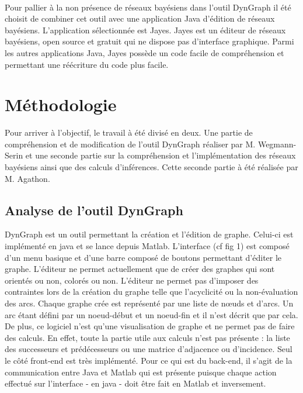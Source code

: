 \documentclass[conference]{IEEEtran}
\begin{document}
\\
Pour pallier à la non présence de réseaux bayésiens dans l'outil DynGraph il été choisit de combiner cet outil avec une application Java d'édition de réseaux bayésiens. L'application sélectionnée est Jayes. Jayes est un éditeur de réseaux bayésiens, open source et gratuit qui ne dispose pas d'interface graphique. Parmi les autres applications Java, Jayes possède un code facile de compréhension et permettant une réécriture du code plus facile.




\section{Méthodologie}

Pour arriver à l'objectif, le travail à été divisé en deux. Une partie de compréhension et de modification de l'outil DynGraph réaliser par M. Wegmann-Serin et une seconde partie sur la compréhension et l'implémentation des réseaux bayésiens ainsi que des calculs d'inférences. Cette seconde partie à été réalisée par M. Agathon. \\


\subsection{Analyse de l'outil DynGraph}

DynGraph est un outil permettant la création et l'édition de graphe. Celui-ci est implémenté en java et se lance depuis Matlab.
L'interface (cf fig 1) est composé d'un menu basique et d'une barre composé de boutons permettant d'éditer le graphe. L'éditeur ne permet actuellement que de créer des graphes qui sont orientés ou non, colorés ou non. L'éditeur ne permet pas d'imposer des contraintes lors de la création du graphe telle que l'acyclicité ou la non-évaluation des arcs. Chaque graphe crée est représenté par une liste de nœuds et d'arcs. Un arc étant défini par un noeud-début et un noeud-fin et il n'est décrit que par cela. De plus, ce logiciel n'est qu'une visualisation de graphe et ne permet pas de faire des calculs. En effet, toute la partie utile aux calculs n'est pas présente : la liste des successeurs et prédécesseurs ou une matrice d'adjacence ou d'incidence. Seul le côté front-end est très implémenté. Pour ce qui est du back-end, il s'agit de la communication entre Java et Matlab qui est présente puisque chaque action effectué sur l'interface - en java - doit être fait en Matlab et inversement.
\end{document}
